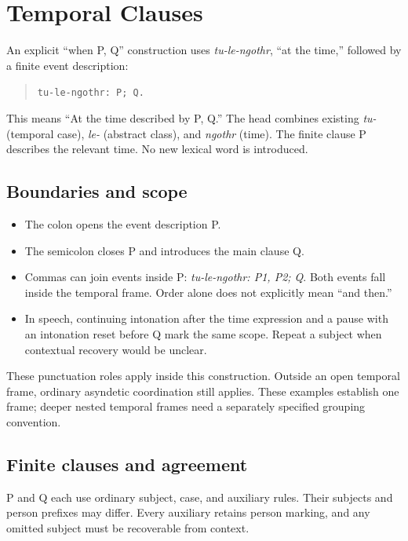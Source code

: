 \section*{Temporal Clauses}

An explicit ``when P, Q'' construction uses \textit{tu-le-ngothr}, ``at the time,'' followed by a finite event description:

\begin{quote}
\texttt{tu-le-ngothr: P; Q.}
\end{quote}

This means ``At the time described by P, Q.'' The head combines existing \textit{tu-} (temporal case), \textit{le-} (abstract class), and \textit{ngothr} (time). The finite clause P describes the relevant time. No new lexical word is introduced.

\subsection*{Boundaries and scope}

\begin{itemize}
\item The colon opens the event description P.
\item The semicolon closes P and introduces the main clause Q.
\item Commas can join events inside P: \textit{tu-le-ngothr: P1, P2; Q}. Both events fall inside the temporal frame. Order alone does not explicitly mean ``and then.''
\item In speech, continuing intonation after the time expression and a pause with an intonation reset before Q mark the same scope. Repeat a subject when contextual recovery would be unclear.
\end{itemize}

These punctuation roles apply inside this construction. Outside an open temporal frame, ordinary asyndetic coordination still applies. These examples establish one frame; deeper nested temporal frames need a separately specified grouping convention.

\subsection*{Finite clauses and agreement}

P and Q each use ordinary subject, case, and auxiliary rules. Their subjects and person prefixes may differ. Every auxiliary retains person marking, and any omitted subject must be recoverable from context.

